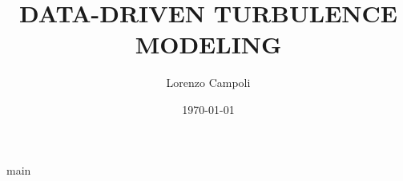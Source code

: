 \documentclass{article}
\title{DATA-DRIVEN TURBULENCE MODELING}
\author{Lorenzo Campoli}
\date{\today}
\begin{document}
\maketitle

\makenomenclature

\printnomenclature[3cm]

\tableofcontents

\listoffigures

\listoftables


%
%

\newpage
{main}



%
%
%
%
%
%
%
\end{document}
